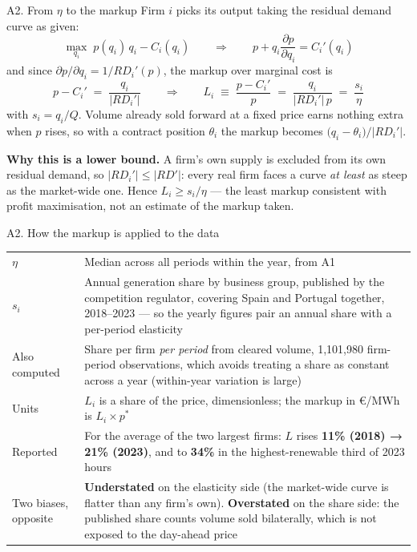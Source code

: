 \documentclass[9pt,aspectratio=169]{beamer}
\makeatletter
\providecommand{\euro}{€}
\newcommand{\designtable}[2]{%
  \small
  \begin{tabularx}{\textwidth}{@{}>{\raggedright\arraybackslash}p{#1}X@{}}
  \toprule
  #2
  \bottomrule
  \end{tabularx}%
}
\makeatother
\begin{document}
\begin{frame}{A2. From $\eta$ to the markup}
  \small
  Firm $i$ picks its output taking the residual demand curve as given:
  \[
    \max_{q_i} \; p(q_i)\, q_i - C_i(q_i)
    \qquad\Longrightarrow\qquad
    p + q_i \frac{\partial p}{\partial q_i} = C_i'(q_i)
  \]
  and since $\partial p / \partial q_i = 1 / RD_i'(p)$, the markup over
  marginal cost is
  \[
    p - C_i'
    \;=\; \frac{q_i}{\bigl| RD_i' \bigr|}
    \qquad\Longrightarrow\qquad
    L_i \;\equiv\; \frac{p - C_i'}{p}
    \;=\; \frac{q_i}{\bigl| RD_i' \bigr| \, p}
    \;=\; \frac{s_i}{\eta}
  \]
  with $s_i = q_i / Q$. Volume already sold forward at a fixed price earns
  nothing extra when $p$ rises, so with a contract position $\theta_i$ the
  markup becomes $\bigl(q_i - \theta_i\bigr) / |RD_i'|$.

  \vspace{0.5em}
  \textbf{Why this is a lower bound.} A firm's own supply is excluded from its
  own residual demand, so $|RD_i'| \leq |RD'|$: every real firm faces a curve
  \emph{at least} as steep as the market-wide one. Hence
  $L_i \geq s_i / \eta$ --- the least markup consistent with profit
  maximisation, not an estimate of the markup taken.
\end{frame}

\begin{frame}{A2. How the markup is applied to the data}
  \designtable{}{
    $\eta$ & Median across all periods within the year, from A1 \\
    $s_i$ & Annual generation share by business group, published by the
    competition regulator, covering Spain and Portugal together, 2018--2023 ---
    so the yearly figures pair an annual share with a per-period elasticity \\
    Also computed & Share per firm \emph{per period} from cleared volume,
    1,101,980 firm-period observations, which avoids treating a share as
    constant across a year (within-year variation is large) \\
    Units & $L_i$ is a share of the price, dimensionless; the markup in
    \euro/MWh is $L_i \times p^*$ \\
    Reported & For the average of the two largest firms: $L$ rises
    \textbf{11\% (2018) → 21\% (2023)}, and to \textbf{34\%} in the
    highest-renewable third of 2023 hours \\
    Two biases, opposite & \textbf{Understated} on the elasticity side (the
    market-wide curve is flatter than any firm's own). \textbf{Overstated} on
    the share side: the published share counts volume sold bilaterally, which
    is not exposed to the day-ahead price \\
  }
\end{frame}
\end{document}
